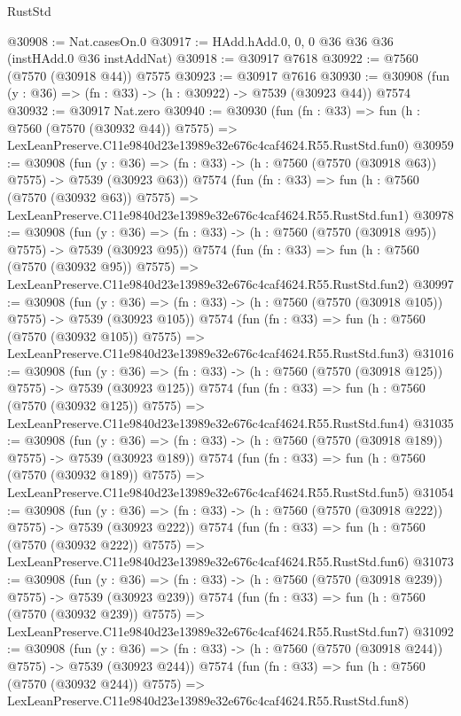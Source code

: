 \begin{lexlean}{RustStd}
\begin{coremodule}
@30908 := Nat.casesOn.{0}
@30917 := HAdd.hAdd.{0, 0, 0} @36 @36 @36 (instHAdd.{0} @36 instAddNat)
@30918 := @30917 @7618
@30922 := @7560 (@7570 (@30918 @44)) @7575
@30923 := @30917 @7616
@30930 := @30908 (fun (y : @36) => (fn : @33) -> (h : @30922) -> @7539 (@30923 @44)) @7574
@30932 := @30917 Nat.zero
@30940 := @30930
    (fun (fn : @33) =>
    fun (h : @7560 (@7570 (@30932 @44)) @7575) =>
    LexLeanPreserve.C11e9840d23e13989e32e676c4caf4624.R55.RustStd.fun0)
@30959 := @30908
    (fun (y : @36) => (fn : @33) -> (h : @7560 (@7570 (@30918 @63)) @7575) -> @7539 (@30923 @63))
    @7574
    (fun (fn : @33) =>
    fun (h : @7560 (@7570 (@30932 @63)) @7575) =>
    LexLeanPreserve.C11e9840d23e13989e32e676c4caf4624.R55.RustStd.fun1)
@30978 := @30908
    (fun (y : @36) => (fn : @33) -> (h : @7560 (@7570 (@30918 @95)) @7575) -> @7539 (@30923 @95))
    @7574
    (fun (fn : @33) =>
    fun (h : @7560 (@7570 (@30932 @95)) @7575) =>
    LexLeanPreserve.C11e9840d23e13989e32e676c4caf4624.R55.RustStd.fun2)
@30997 := @30908
    (fun (y : @36) => (fn : @33) -> (h : @7560 (@7570 (@30918 @105)) @7575) -> @7539 (@30923 @105))
    @7574
    (fun (fn : @33) =>
    fun (h : @7560 (@7570 (@30932 @105)) @7575) =>
    LexLeanPreserve.C11e9840d23e13989e32e676c4caf4624.R55.RustStd.fun3)
@31016 := @30908
    (fun (y : @36) => (fn : @33) -> (h : @7560 (@7570 (@30918 @125)) @7575) -> @7539 (@30923 @125))
    @7574
    (fun (fn : @33) =>
    fun (h : @7560 (@7570 (@30932 @125)) @7575) =>
    LexLeanPreserve.C11e9840d23e13989e32e676c4caf4624.R55.RustStd.fun4)
@31035 := @30908
    (fun (y : @36) => (fn : @33) -> (h : @7560 (@7570 (@30918 @189)) @7575) -> @7539 (@30923 @189))
    @7574
    (fun (fn : @33) =>
    fun (h : @7560 (@7570 (@30932 @189)) @7575) =>
    LexLeanPreserve.C11e9840d23e13989e32e676c4caf4624.R55.RustStd.fun5)
@31054 := @30908
    (fun (y : @36) => (fn : @33) -> (h : @7560 (@7570 (@30918 @222)) @7575) -> @7539 (@30923 @222))
    @7574
    (fun (fn : @33) =>
    fun (h : @7560 (@7570 (@30932 @222)) @7575) =>
    LexLeanPreserve.C11e9840d23e13989e32e676c4caf4624.R55.RustStd.fun6)
@31073 := @30908
    (fun (y : @36) => (fn : @33) -> (h : @7560 (@7570 (@30918 @239)) @7575) -> @7539 (@30923 @239))
    @7574
    (fun (fn : @33) =>
    fun (h : @7560 (@7570 (@30932 @239)) @7575) =>
    LexLeanPreserve.C11e9840d23e13989e32e676c4caf4624.R55.RustStd.fun7)
@31092 := @30908
    (fun (y : @36) => (fn : @33) -> (h : @7560 (@7570 (@30918 @244)) @7575) -> @7539 (@30923 @244))
    @7574
    (fun (fn : @33) =>
    fun (h : @7560 (@7570 (@30932 @244)) @7575) =>
    LexLeanPreserve.C11e9840d23e13989e32e676c4caf4624.R55.RustStd.fun8)

\end{coremodule}
\end{lexlean}
